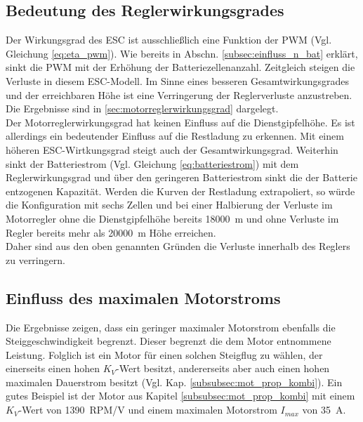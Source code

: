 \subsection{Bedeutung des Reglerwirkungsgrades}
\label{subsec:einfluss_eta_pwm}
Der Wirkungsgrad des ESC ist ausschließlich eine Funktion der PWM (Vgl. Gleichung \ref{eq:eta_pwm}). Wie bereits in Abschn. \ref{subsec:einfluss_n_bat} erklärt, sinkt die PWM mit der Erhöhung der Batteriezellenanzahl. Zeitgleich steigen die Verluste in diesem ESC-Modell. Im Sinne eines besseren Gesamtwirkungsgrades und der erreichbaren Höhe ist eine Verringerung der Reglerverluste anzustreben. Die Ergebnisse sind in \ref{sec:motorreglerwirkungsgrad} dargelegt. \\
Der Motorreglerwirkungsgrad hat keinen Einfluss auf die Dienstgipfelhöhe. Es ist allerdings ein bedeutender Einfluss auf die Restladung zu erkennen. Mit einem höheren ESC-Wirtkungsgrad steigt auch der Gesamtwirkungsgrad. Weiterhin sinkt der Batteriestrom (Vgl. Gleichung \ref{eq:batteriestrom}) mit dem Reglerwirkungsgrad und über den geringeren Batteriestrom sinkt die der Batterie entzogenen Kapazität. Werden die Kurven der Restladung extrapoliert, so würde die Konfiguration mit sechs Zellen und bei einer Halbierung der Verluste im Motorregler ohne die Dienstgipfelhöhe bereits \SI{18000}{m} und ohne Verluste im Regler bereits mehr als \SI{20000}{m} Höhe erreichen. \\
Daher sind aus den oben genannten Gründen die Verluste innerhalb des Reglers zu verringern. 


\subsection{Einfluss des maximalen Motorstroms}
Die Ergebnisse zeigen, dass ein geringer maximaler Motorstrom ebenfalls die Steiggeschwindigkeit begrenzt. Dieser begrenzt die dem Motor entnommene Leistung. 
Folglich ist ein Motor für einen solchen Steigflug zu wählen, der einerseits einen hohen \ensuremath{K_V}-Wert besitzt, andererseits aber auch einen hohen maximalen Dauerstrom besitzt (Vgl. Kap. \ref{subsubsec:mot_prop_kombi}). Ein gutes Beispiel ist der Motor aus Kapitel \ref{subsubsec:mot_prop_kombi} mit einem \ensuremath{K_V}-Wert von \SI{1390}{RPM/V} und einem maximalen Motorstrom \ensuremath{I_{max}} von \SI{35}{A}.




